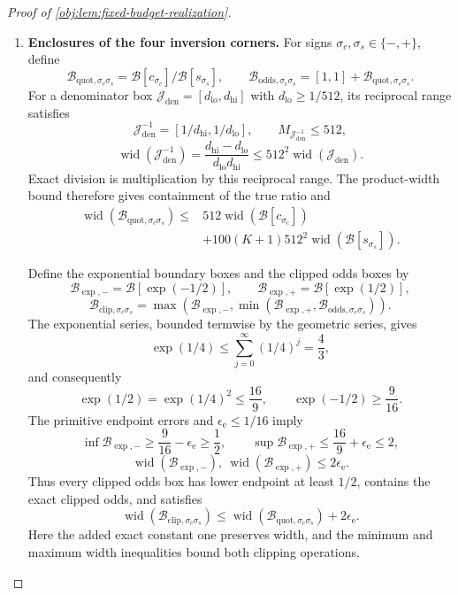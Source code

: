 \begin{proof}[Proof of \cref{obj:lem:fixed-budget-realization}]
\begin{enumerate}
\item \textbf{Enclosures of the four inversion corners.}
For signs \(\sigma_c,\sigma_s\in\{-,+\}\), define
\[
\mathcal B_{\mathrm{quot},\sigma_c\sigma_s}
=\mathcal B[c_{\sigma_c}]/\mathcal B[s_{\sigma_s}],
\qquad
\mathcal B_{\mathrm{odds},\sigma_c\sigma_s}
=[1,1]+\mathcal B_{\mathrm{quot},\sigma_c\sigma_s}.
\]
For a denominator box
\(\mathcal J_{\mathrm{den}}=[d_{\mathrm{lo}},d_{\mathrm{hi}}]\)
with \(d_{\mathrm{lo}}\ge1/512\), its reciprocal range satisfies
\[
\mathcal J_{\mathrm{den}}^{-1}
=[1/d_{\mathrm{hi}},1/d_{\mathrm{lo}}],
\qquad
M_{\mathcal J_{\mathrm{den}}^{-1}}\le512,
\]
\[
\operatorname{wid}(\mathcal J_{\mathrm{den}}^{-1})
=
\frac{d_{\mathrm{hi}}-d_{\mathrm{lo}}}
     {d_{\mathrm{lo}}d_{\mathrm{hi}}}
\le512^2\operatorname{wid}(\mathcal J_{\mathrm{den}}).
\]
Exact division is multiplication by this reciprocal range. The product-width bound therefore gives containment of the true ratio and
\[
\begin{aligned}
\operatorname{wid}(\mathcal B_{\mathrm{quot},\sigma_c\sigma_s})
\le{}&
512\operatorname{wid}(\mathcal B[c_{\sigma_c}])\\
&+100(K+1)512^2
 \operatorname{wid}(\mathcal B[s_{\sigma_s}]).
\end{aligned}
\]

Define the exponential boundary boxes and the clipped odds boxes by
\[
\mathcal B_{\exp,-}=\mathcal B[\exp(-1/2)],
\qquad
\mathcal B_{\exp,+}=\mathcal B[\exp(1/2)],
\]
\[
\mathcal B_{\mathrm{clip},\sigma_c\sigma_s}
=
\max\left(
\mathcal B_{\exp,-},
\min\left(\mathcal B_{\exp,+},
          \mathcal B_{\mathrm{odds},\sigma_c\sigma_s}\right)
\right).
\]
The exponential series, bounded termwise by the geometric series, gives
\[
\exp(1/4)\le\sum_{j=0}^{\infty}(1/4)^j=\frac43,
\]
and consequently
\[
\exp(1/2)=\exp(1/4)^2\le\frac{16}{9},
\qquad
\exp(-1/2)\ge\frac9{16}.
\]
The primitive endpoint errors and \(\epsilon_{\mathrm e}\le1/16\) imply
\[
\inf\mathcal B_{\exp,-}\ge\frac9{16}-\epsilon_{\mathrm e}\ge\frac12,
\qquad
\sup\mathcal B_{\exp,+}\le\frac{16}{9}+\epsilon_{\mathrm e}\le2,
\]
\[
\operatorname{wid}(\mathcal B_{\exp,-}),
\ \operatorname{wid}(\mathcal B_{\exp,+})
\le2\epsilon_{\mathrm e}.
\]
Thus every clipped odds box has lower endpoint at least \(1/2\), contains the exact clipped odds, and satisfies
\[
\operatorname{wid}(\mathcal B_{\mathrm{clip},\sigma_c\sigma_s})
\le
\operatorname{wid}(\mathcal B_{\mathrm{quot},\sigma_c\sigma_s})
+2\epsilon_{\mathrm e}.
\]
Here the added exact constant one preserves width, and the minimum and maximum width inequalities bound both clipping operations.


\end{enumerate}
\end{proof}
